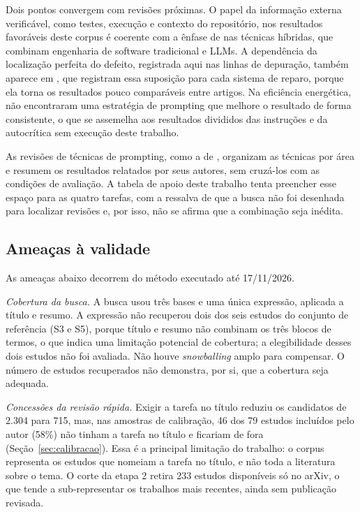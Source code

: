 Dois pontos convergem com revisões próximas.
O papel da informação externa verificável, como testes, execução e contexto do repositório, nos resultados
favoráveis deste corpus é coerente com a ênfase de  nas técnicas híbridas, que
combinam engenharia de software tradicional e LLMs.
A dependência da localização perfeita do defeito, registrada aqui nas linhas de depuração, também aparece em
, que registram essa suposição para cada sistema de reparo, porque ela torna os
resultados pouco comparáveis entre artigos.
Na eficiência energética,  não encontraram uma estratégia de prompting
que melhore o resultado de forma consistente, o que se assemelha aos resultados divididos das instruções e da
autocrítica sem execução deste trabalho.

As revisões de técnicas de prompting, como a de , organizam as técnicas por área
e resumem os resultados relatados por seus autores, sem cruzá-los com as condições de avaliação. A tabela de apoio
deste trabalho tenta preencher esse espaço para as quatro tarefas, com a ressalva de que a busca não foi desenhada
para localizar revisões e, por isso, não se afirma que a combinação seja inédita.

\subsection{Ameaças à validade}\label{sec:ameacas}
As ameaças abaixo decorrem do método executado até 17/11/2026.

\textit{Cobertura da busca.} A busca usou três bases e uma única expressão, aplicada a título e resumo. A expressão
não recuperou dois dos seis estudos do conjunto de referência (S3 e S5), porque título e resumo não combinam os
três blocos de termos, o que indica uma limitação potencial de cobertura; a elegibilidade desses dois estudos não
foi avaliada. Não houve \textit{snowballing} amplo para compensar.
O número de estudos recuperados não demonstra, por si, que a cobertura seja adequada.

\textit{Concessões da revisão rápida.} Exigir a tarefa no título reduziu os candidatos de 2.304 para 715, mas, nas
amostras de calibração, 46 dos 79 estudos incluídos pelo autor (58\%) não tinham a tarefa no título e ficariam de
fora (Seção~\ref{sec:calibracao}). Essa é a principal limitação do trabalho: o corpus representa os estudos que
nomeiam a tarefa no título, e não toda a literatura sobre o tema. O corte da etapa 2 retira 233 estudos disponíveis
só no arXiv, o que tende a sub-representar os trabalhos mais recentes, ainda sem publicação revisada.


